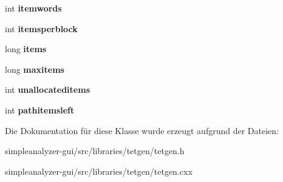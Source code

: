 \begin{DoxyCompactItemize}
\item 
\hypertarget{classtetgenmesh_1_1memorypool_a11a5e52e6559d7fcd95de844d69a37a4}{int {\bfseries itemwords}}\label{classtetgenmesh_1_1memorypool_a11a5e52e6559d7fcd95de844d69a37a4}

\item 
\hypertarget{classtetgenmesh_1_1memorypool_a06ef9dbd1dec025a8c0475aaac348d3a}{int {\bfseries itemsperblock}}\label{classtetgenmesh_1_1memorypool_a06ef9dbd1dec025a8c0475aaac348d3a}

\item 
\hypertarget{classtetgenmesh_1_1memorypool_af29a38b2654a8d977dd24eea8dc72729}{long {\bfseries items}}\label{classtetgenmesh_1_1memorypool_af29a38b2654a8d977dd24eea8dc72729}

\item 
\hypertarget{classtetgenmesh_1_1memorypool_ae9dda5bafe91eed206b26fa7d7020716}{long {\bfseries maxitems}}\label{classtetgenmesh_1_1memorypool_ae9dda5bafe91eed206b26fa7d7020716}

\item 
\hypertarget{classtetgenmesh_1_1memorypool_aa8a5667ab1f55ec7ef852d378871b9ee}{int {\bfseries unallocateditems}}\label{classtetgenmesh_1_1memorypool_aa8a5667ab1f55ec7ef852d378871b9ee}

\item 
\hypertarget{classtetgenmesh_1_1memorypool_ad83a51d49f6e03ff38151b870a2f51dd}{int {\bfseries pathitemsleft}}\label{classtetgenmesh_1_1memorypool_ad83a51d49f6e03ff38151b870a2f51dd}

\end{DoxyCompactItemize}


Die Dokumentation für diese Klasse wurde erzeugt aufgrund der Dateien\-:\begin{DoxyCompactItemize}
\item 
simpleanalyzer-\/gui/src/libraries/tetgen/tetgen.\-h\item 
simpleanalyzer-\/gui/src/libraries/tetgen/tetgen.\-cxx\end{DoxyCompactItemize}
